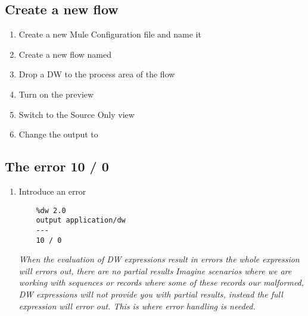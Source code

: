\subsection{Create a new flow}
\begin{enumerate}
\item Create a new Mule Configuration file and name it 
\item Create a new flow named 
\item Drop a DW to the process area of the flow
\item Turn on the preview
\item Switch to the Source Only view
\item Change the output to 
\end{enumerate}

\subsection{The error 10 / 0}
\begin{enumerate}[resume*]
\item Introduce an error
  \begin{lstlisting}
    %dw 2.0
    output application/dw
    ---
    10 / 0
  \end{lstlisting}
  \emph{
    When the evaluation of DW expressions result in errors the whole expression will errors out, there are no partial results
  }
  \newline
  \emph{
    Imagine scenarios where we are working with sequences or records where some of these records our malformed, DW expressions will not provide you with partial results, instead the full expression will error out.  This is where error handling is needed.
  }
\end{enumerate}

